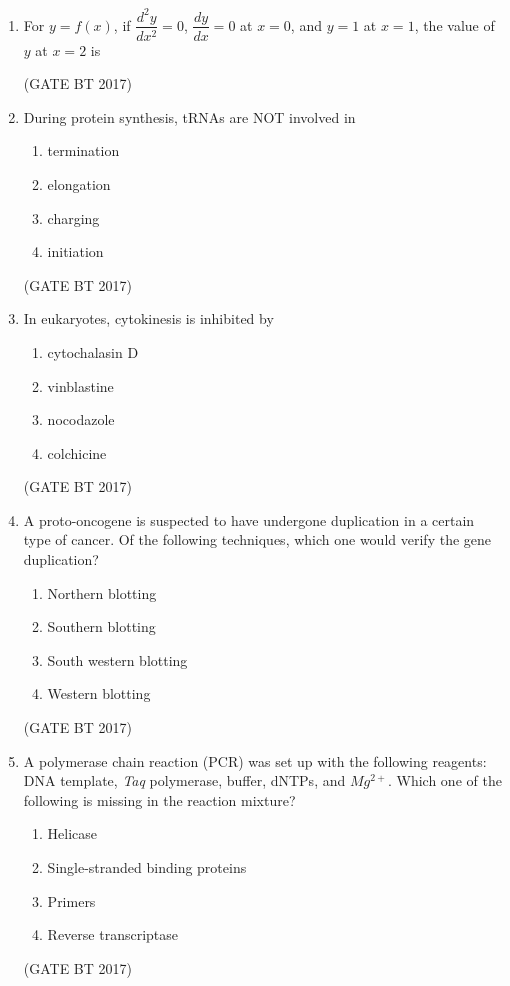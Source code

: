 \documentclass[journal,12pt,onecolumn]{IEEEtran}
\theoremstyle{remark}
\begin{document}
\begin{enumerate}
\item For $y=f(x)$, if $\dfrac{d^{2}y}{dx^{2}}=0$, $\dfrac{dy}{dx}=0$ at $x=0$, and $y=1$ at $x=1$, the value of $y$ at $x=2$ is   

\hfill (GATE BT 2017)

\item During protein synthesis, tRNAs are NOT involved in
\begin{enumerate}
    \item termination
    \item elongation 
    \item  charging 
    \item initiation   
     \end{enumerate}
\hfill (GATE BT 2017)

\item In eukaryotes, cytokinesis is inhibited by  
\begin{enumerate}
    \item cytochalasin D
    \item vinblastine
    \item nocodazole
    \item colchicine
\end{enumerate}
\hfill (GATE BT 2017)

\item A proto-oncogene is suspected to have undergone duplication in a certain type of cancer. Of the following techniques, which one would verify the gene duplication?  
\begin{enumerate}
    \item Northern blotting
    \item Southern blotting
    \item South western blotting
    \item Western blotting
\end{enumerate}
\hfill (GATE BT 2017)

\item A polymerase chain reaction (PCR) was set up with the following reagents: DNA template, \textit{Taq} polymerase, buffer, dNTPs, and $Mg^{2+}$. Which one of the following is missing in the reaction mixture?
\begin{enumerate}
    \item Helicase
    \item Single-stranded binding proteins
    \item Primers
    \item Reverse transcriptase
\end{enumerate}
\hfill (GATE BT 2017)


\end{enumerate}
\end{document}
